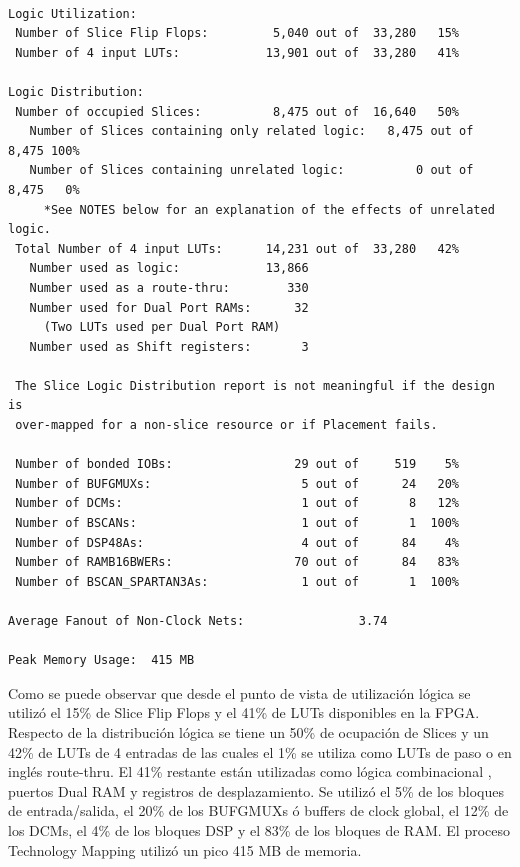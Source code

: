 \begin{lstlisting}[frame=single,caption={Resumen de utilización - MinSoC},label={lst:resultparminsoc},breaklines]

Logic Utilization:
 Number of Slice Flip Flops:         5,040 out of  33,280   15%
 Number of 4 input LUTs:            13,901 out of  33,280   41%

Logic Distribution:
 Number of occupied Slices:          8,475 out of  16,640   50%
   Number of Slices containing only related logic:   8,475 out of   8,475 100%
   Number of Slices containing unrelated logic:          0 out of   8,475   0%
     *See NOTES below for an explanation of the effects of unrelated logic.
 Total Number of 4 input LUTs:      14,231 out of  33,280   42%
   Number used as logic:            13,866
   Number used as a route-thru:        330
   Number used for Dual Port RAMs:      32
     (Two LUTs used per Dual Port RAM)
   Number used as Shift registers:       3

 The Slice Logic Distribution report is not meaningful if the design is
 over-mapped for a non-slice resource or if Placement fails.

 Number of bonded IOBs:                 29 out of     519    5%
 Number of BUFGMUXs:                     5 out of      24   20%
 Number of DCMs:                         1 out of       8   12%
 Number of BSCANs:                       1 out of       1  100%
 Number of DSP48As:                      4 out of      84    4%
 Number of RAMB16BWERs:                 70 out of      84   83%
 Number of BSCAN_SPARTAN3As:             1 out of       1  100%

Average Fanout of Non-Clock Nets:                3.74

Peak Memory Usage:  415 MB

\end{lstlisting}

	Como se puede observar que desde el punto de vista de utilización lógica se utilizó el 15\% de Slice Flip Flops y el 41\% de LUTs disponibles en
	la FPGA. Respecto de la distribución lógica se tiene un 50\% de ocupación de Slices y un 42\% de LUTs de 4 entradas de las cuales el 1\% se utiliza
	como LUTs de paso o en inglés route-thru. El 41\% restante están utilizadas como lógica combinacional , puertos Dual RAM y registros de
	desplazamiento. Se utilizó el 5\% de los bloques de entrada/salida, el 20\% de los BUFGMUXs ó buffers de clock global, el 12\% de los DCMs, el 4\% de
	los bloques DSP y el 83\% de los bloques de RAM. El proceso Technology Mapping utilizó un pico 415 MB de memoria.


